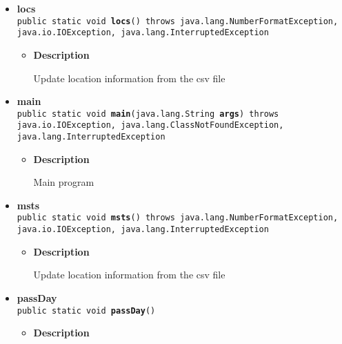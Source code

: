 {{{\begin{itemize}
{\begin{itemize}
{Load a serialized file
}
\item{
{\bf  Parameters}
  \begin{itemize}
   \item{
\texttt{prompt} -- prompt for the user}
  \end{itemize}
}%
\item{{\bf  Returns} -- 
the object included in the file 
}%
\end{itemize}
}%
\item{ 
{\bf  locs}\\
\texttt{public static void\ {\bf  locs}() throws java.lang.NumberFormatException, java.io.IOException, java.lang.InterruptedException
\label{personOfInterest.Game.locs()}}%
\begin{itemize}
\item{
{\bf  Description}

Update location information from the csv file
}
\end{itemize}
}%
\item{ 
{\bf  main}\\
\texttt{public static void\ {\bf  main}(\texttt{java.lang.String\lbrack \rbrack } {\bf  args}) throws java.io.IOException, java.lang.ClassNotFoundException, java.lang.InterruptedException
\label{personOfInterest.Game.main(java.lang.String[])}}%
\begin{itemize}
\item{
{\bf  Description}

Main program
}
\end{itemize}
}%
\item{ 
{\bf  msts}\\
\texttt{public static void\ {\bf  msts}() throws java.lang.NumberFormatException, java.io.IOException, java.lang.InterruptedException
\label{personOfInterest.Game.msts()}}%
\begin{itemize}
\item{
{\bf  Description}

Update location information from the csv file
}
\end{itemize}
}%
\item{ 
{\bf  passDay}\\
\texttt{public static void\ {\bf  passDay}()
\label{personOfInterest.Game.passDay()}}%
\begin{itemize}
\item{
{\bf  Description}

}
\end{itemize}}
\end{itemize}}}}

